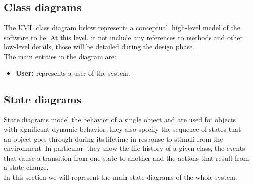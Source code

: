 \subsection{Class diagrams}
The UML class diagram below represents a conceptual, high-level model of the software to be. 
At this level, it not include any references to methods and other low-level details, those will be detailed during the design phase. \\
The main entities in the diagram are:
\begin{itemize}
    \item \textbf{User:} represents a user of the system.
\end{itemize}

\subsection{State diagrams}
State diagrams model the behavior of a single object and are used for objects with 
significant dynamic behavior; they also specify the sequence of states that an 
object goes through during its lifetime in response to stimuli from the environment.
 In particular, they show the life history of a given class, the events that cause a transition
  from one state to another and the actions that result from a state change.\\
In this section we will represent the main state diagrams of the whole system.

